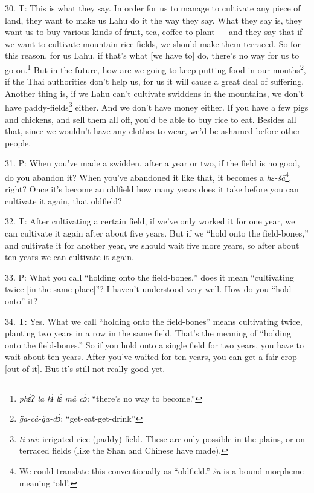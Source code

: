 30. T: This is what they say. In order for us to manage to cultivate any piece
of land, they want to make us Lahu do it the way they say. What they say is, they
want us to buy various kinds of fruit, tea, coffee to plant --- and they say that
if we want to cultivate mountain rice fields, we should make them terraced. So
for this reason, for us Lahu, if that's what [we have to] do, there's no way for
us to go on.\footnote{\textit{phɛ̀ʔ la kɨ̀ lɛ̀ mâ cɔ̀}: ``there's no way to become.''} But in the future, how are we going to keep putting food in our
mouths\footnote{\textit{g̈a-câ-g̈a-dɔ̀}: ``get-eat-get-drink''}, if the Thai authorities don't help us, for us it will cause a great
deal of suffering. Another thing is, if we Lahu can't cultivate swiddens in the
mountains, we don't have paddy-fields\footnote{\textit{ti-mi}: irrigated rice (paddy) field. These are only possible in the plains, or on terraced fields (like the Shan and Chinese have made).} either. And we don't have money either.
If you have a few pigs and chickens, and sell them all off, you'd be able to buy
rice to eat. Besides all that, since we wouldn't have any clothes to wear, we'd
be ashamed before other people.

31. P: When you've made a swidden, after a year or two, if the field is no good,
do you abandon it? When you've abandoned it like that, it becomes a \textit{hɛ-šā}\footnote{We could translate this conventionally as ``oldfield.'' \textit{šā} is a bound morpheme meaning `old'.},
right? Once it's become an oldfield how many years does it take before you can
cultivate it again, that oldfield?

32. T: After cultivating a certain field, if we've only worked it for one year,
we can cultivate it again after about five years. But if we ``hold onto the field-bones,''
and cultivate it for another year, we should wait five more years, so after about
ten years we can cultivate it again.

33. P: What you call ``holding onto the field-bones,'' does it mean ``cultivating
twice [in the same place]''? I haven't understood very well. How do you ``hold
onto'' it?

34. T: Yes. What we call ``holding onto the field-bones'' means cultivating twice,
planting two years in a row in the same field. That's the meaning of ``holding
onto the field-bones.'' So if you hold onto a single field for two years, you have
to wait about ten years. After you've waited for ten years, you can get a fair
crop [out of it]. But it's still not really good yet.

